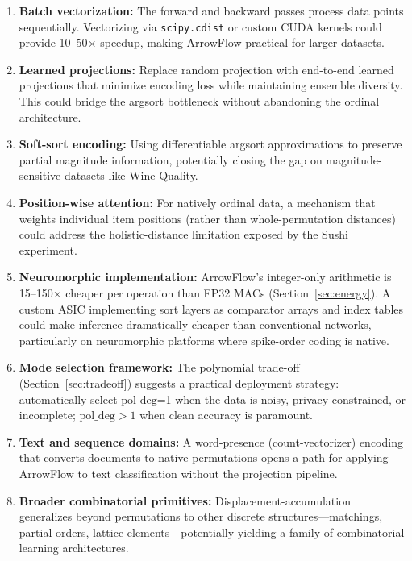 \documentclass[12pt]{article}
\begin{document}
\begin{enumerate}[leftmargin=2em]
  \item \textbf{Batch vectorization:} The forward and backward passes process data points sequentially. Vectorizing via \texttt{scipy.cdist} or custom CUDA kernels could provide 10--50$\times$ speedup, making ArrowFlow practical for larger datasets.
  \item \textbf{Learned projections:} Replace random projection with end-to-end learned projections that minimize encoding loss while maintaining ensemble diversity. This could bridge the argsort bottleneck without abandoning the ordinal architecture.
  \item \textbf{Soft-sort encoding:} Using differentiable argsort approximations \citep{prillo2020softsort} to preserve partial magnitude information, potentially closing the gap on magnitude-sensitive datasets like Wine Quality.
  \item \textbf{Position-wise attention:} For natively ordinal data, a mechanism that weights individual item positions (rather than whole-permutation distances) could address the holistic-distance limitation exposed by the Sushi experiment.
  \item \textbf{Neuromorphic implementation:} ArrowFlow's integer-only arithmetic is 15--150$\times$ cheaper per operation than FP32 MACs (Section~\ref{sec:energy}). A custom ASIC implementing sort layers as comparator arrays and index tables could make inference dramatically cheaper than conventional networks, particularly on neuromorphic platforms \citep{davies2018loihi, merolla2014million} where spike-order coding is native.
  \item \textbf{Mode selection framework:} The polynomial trade-off (Section~\ref{sec:tradeoff}) suggests a practical deployment strategy: automatically select $\mathrm{pol\_deg}$=1 when the data is noisy, privacy-constrained, or incomplete; $\mathrm{pol\_deg}>1$ when clean accuracy is paramount.
  \item \textbf{Text and sequence domains:} A word-presence (count-vectorizer) encoding that converts documents to native permutations opens a path for applying ArrowFlow to text classification without the projection pipeline.
  \item \textbf{Broader combinatorial primitives:} Displacement-accumulation generalizes beyond permutations to other discrete structures---matchings, partial orders, lattice elements---potentially yielding a family of combinatorial learning architectures.
\end{enumerate}
\end{document}
